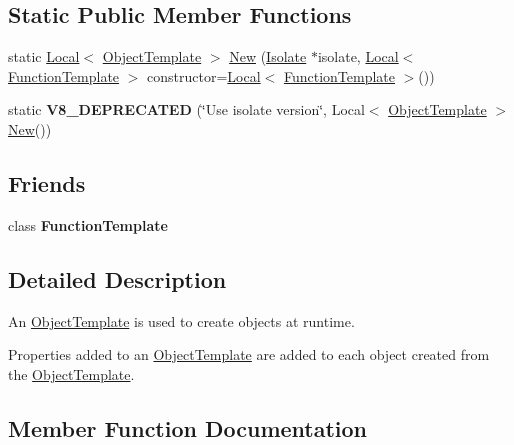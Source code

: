 \subsection*{Static Public Member Functions}
\begin{DoxyCompactItemize}
\item 
static \hyperlink{classv8_1_1Local}{Local}$<$ \hyperlink{classv8_1_1ObjectTemplate}{Object\+Template} $>$ \hyperlink{classv8_1_1ObjectTemplate_ae0bcd58e9e069c50148c377d774de7a1}{New} (\hyperlink{classv8_1_1Isolate}{Isolate} $\ast$isolate, \hyperlink{classv8_1_1Local}{Local}$<$ \hyperlink{classv8_1_1FunctionTemplate}{Function\+Template} $>$ constructor=\hyperlink{classv8_1_1Local}{Local}$<$ \hyperlink{classv8_1_1FunctionTemplate}{Function\+Template} $>$())
\item 
static {\bfseries V8\+\_\+\+D\+E\+P\+R\+E\+C\+A\+T\+ED} (\char`\"{}Use isolate version\char`\"{}, Local$<$ \hyperlink{classv8_1_1ObjectTemplate}{Object\+Template} $>$ \hyperlink{classv8_1_1ObjectTemplate_ae0bcd58e9e069c50148c377d774de7a1}{New}())\hypertarget{classv8_1_1ObjectTemplate_aca569a9eafe2f49f8638e0157d1b20a2}{}\label{classv8_1_1ObjectTemplate_aca569a9eafe2f49f8638e0157d1b20a2}

\end{DoxyCompactItemize}
\subsection*{Friends}
\begin{DoxyCompactItemize}
\item 
class {\bfseries Function\+Template}\hypertarget{classv8_1_1ObjectTemplate_a334168ad1a5f39cf17b818ca3356aacd}{}\label{classv8_1_1ObjectTemplate_a334168ad1a5f39cf17b818ca3356aacd}

\end{DoxyCompactItemize}


\subsection{Detailed Description}
An \hyperlink{classv8_1_1ObjectTemplate}{Object\+Template} is used to create objects at runtime.

Properties added to an \hyperlink{classv8_1_1ObjectTemplate}{Object\+Template} are added to each object created from the \hyperlink{classv8_1_1ObjectTemplate}{Object\+Template}. 

\subsection{Member Function Documentation}
